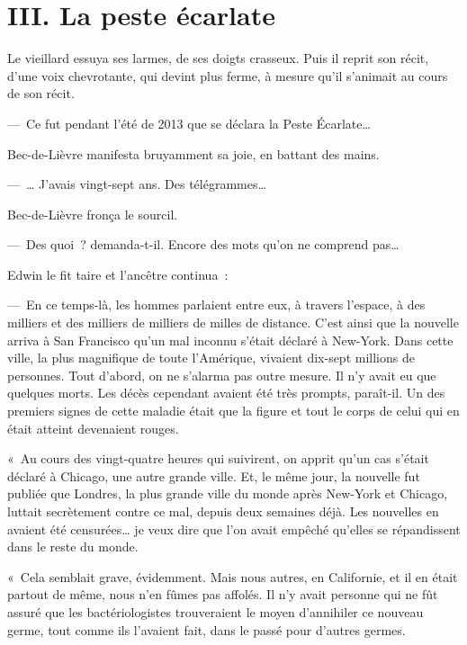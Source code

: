 \documentclass[french,twoside]{book} %
\newcommand\chapteropen{} %
\newcommand\chaptercont{} %
\begin{document}
\chapteropen

\chapter[{III. La peste écarlate}]{III. La peste écarlate}
\renewcommand{\leftmark}{III. La peste écarlate}


\chaptercont
\noindent Le vieillard essuya ses larmes, de ses doigts crasseux. Puis il reprit son récit, d’une voix chevrotante, qui devint plus ferme, à mesure qu’il s’animait au cours de son récit.\par
— Ce fut pendant l’été de 2013 que se déclara la Peste Écarlate…\par
Bec-de-Lièvre manifesta bruyamment sa joie, en battant des mains.\par
— … J’avais vingt-sept ans. Des télégrammes…\par
Bec-de-Lièvre fronça le sourcil.\par
— Des quoi ? demanda-t-il. Encore des mots qu’on ne comprend pas…\par
Edwin le fit taire et l’ancêtre continua :\par
— En ce temps-là, les hommes parlaient entre eux, à travers l’espace, à des milliers et des milliers de milliers de milles de distance. C’est ainsi que la nouvelle arriva à San Francisco qu’un mal inconnu s’était déclaré à New-York. Dans cette ville, la plus magnifique de toute l’Amérique, vivaient dix-sept millions de personnes. Tout d’abord, on ne s’alarma pas outre mesure. Il n’y avait eu que quelques morts. Les décès cependant avaient été très prompts, paraît-il. Un des premiers signes de cette maladie était que la figure et tout le corps de celui qui en était atteint devenaient rouges.\par
« Au cours des vingt-quatre heures qui suivirent, on apprit qu’un cas s’était déclaré à Chicago, une autre grande ville. Et, le même jour, la nouvelle fut publiée que Londres, la plus grande ville du monde après New-York et Chicago, luttait secrètement contre ce mal, depuis deux semaines déjà. Les nouvelles en avaient été censurées… je veux dire que l’on avait empêché qu’elles se répandissent dans le reste du monde.\par
« Cela semblait grave, évidemment. Mais nous autres, en Californie, et il en était partout de même, nous n’en fûmes pas affolés. Il n’y avait personne qui ne fût assuré que les bactériologistes trouveraient le moyen d’annihiler ce nouveau germe, tout comme ils l’avaient fait, dans le passé pour d’autres germes.\par
\end{document}
